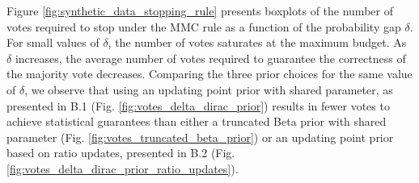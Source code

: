 Figure \ref{fig:synthetic_data_stopping_rule} presents boxplots of the number of votes required to stop under the MMC rule as a function of the probability gap $\delta$. 
For small values of $\delta$, the number of votes saturates at the maximum budget. 
As $\delta$ increases, the average number of votes required to guarantee the correctness of the majority vote decreases. 
Comparing the three prior choices for the same value of $\delta$, we observe that using an updating point prior with shared parameter, as presented in B.1 (Fig. \ref{fig:votes_delta_dirac_prior}) results in fewer votes to achieve statistical guarantees than either a truncated Beta prior with shared parameter (Fig. \ref{fig:votes_truncated_beta_prior}) or an updating point prior based on ratio updates, presented in B.2 (Fig. \ref{fig:votes_delta_dirac_prior_ratio_updates}).

